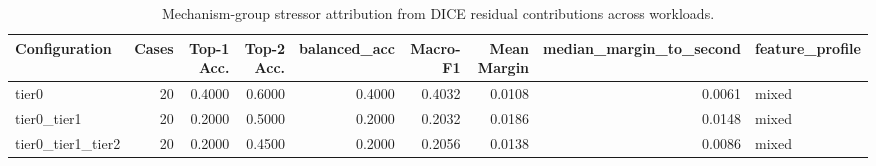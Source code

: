 \begin{table}[t]
\centering
\caption{Mechanism-group stressor attribution from DICE residual contributions across workloads.}
\label{tab:dice_stressor_diagnosis}
\footnotesize
\begin{tabular}{lrrrrrrrl}
\toprule
Configuration & Cases & Top-1 Acc. & Top-2 Acc. & balanced_acc & Macro-F1 & Mean Margin & median_margin_to_second & feature_profile \\
\midrule
tier0 & 20 & 0.4000 & 0.6000 & 0.4000 & 0.4032 & 0.0108 & 0.0061 & mixed \\
tier0_tier1 & 20 & 0.2000 & 0.5000 & 0.2000 & 0.2032 & 0.0186 & 0.0148 & mixed \\
tier0_tier1_tier2 & 20 & 0.2000 & 0.4500 & 0.2000 & 0.2056 & 0.0138 & 0.0086 & mixed \\
\bottomrule
\end{tabular}

\end{table}
